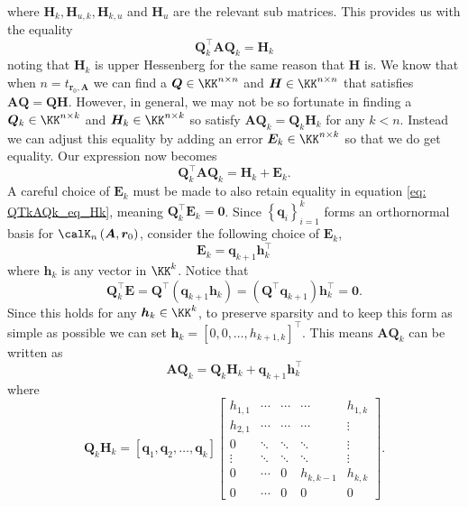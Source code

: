 where $\bm{H}_k , \bm{H}_{u,k}, \bm{H}_{k,u}$ and $\bm{H}_u$ are the relevant sub matrices. This provides us with the equality
\begin{equation}\label{eq: QTkAQk_eq_Hk}
    \bm{Q}_{k}^{\intercal} \bm{A} \bm{Q}_{k} = \bm{H}_k
\end{equation}
noting that $\bm{H}_{k}$ is upper Hessenberg for the same reason that $\bm{H}$ is. We know that when $n = t_{\bm{r}_0, \bm{A}}$ we can find a $\bm{Q} \in \KK^{n \times n}$ and $\bm{H} \in \KK^{n \times n}$ that satisfies $\bm{A} \bm{Q} = \bm{Q} \bm{H}$. However, in general, we may not be so fortunate in finding a $\bm{Q}_{k} \in \KK^{n \times k}$ and $\bm{H}_{k} \in \KK^{n \times k}$ so satisfy $\bm{A} \bm{Q}_{k} = \bm{Q}_{k} \bm{H}_k$ for any $k < n$. Instead we can adjust this equality by adding an error $\bm{E}_k \in \KK^{n \times k}$ so that we do get equality. Our expression now becomes
\begin{equation}\label{eq: QTkAQk_eq_HkEk}
    \bm{Q}_{k}^{\intercal} \bm{A} \bm{Q}_{k} = \bm{H}_k + \bm{E}_k.
\end{equation}
A careful choice of $\bm{E}_k$ must be made to also retain equality in equation \ref{eq: QTkAQk_eq_Hk}, meaning $\bm{Q}_{k}^{\intercal} \bm{E}_k = \bm{0}$. Since $\left\{ \bm{q}_i \right\}_{i=1}^{k}$ forms an orthornormal basis for $\calK_{n} \left( \bm{A}, \bm{r}_0 \right)$, consider the following choice of $\bm{E}_k$,
\[
    \bm{E}_k = \bm{q}_{k+1} \bm{h}_{k}^{\intercal}
\]
where $\bm{h}_k$ is any vector in $\KK^{k}$. Notice that
\[
    \bm{Q}_{k}^{\intercal} \bm{E} = \bm{Q}^{\intercal} \left( \bm{q}_{k+1} \bm{h}_k \right) = \left( \bm{Q}^{\intercal} \bm{q}_{k+1} \right) \bm{h}_{k}^{\intercal} = \bm{0}.
\]
Since this holds for any $\bm{h}_k \in \KK^{k}$, to preserve sparsity and to keep this form as simple as possible we can set $\bm{h}_k = \left[ 0,0, \ldots , h_{k+1,k} \right]^{\intercal}$. This means $\bm{A} \bm{Q}_k$ can be written as
\begin{equation}\label{eq: QTkAQk_eq_Hk_p_qkhk}
    \bm{A} \bm{Q}_k =  \bm{Q}_k \bm{H}_k + \bm{q}_{k+1} \bm{h}_{k}^{\intercal}
\end{equation}
where
\[
    \bm{Q}_k \bm{H}_k =
    \left[ \bm{q}_1 , \bm{q}_2 , \ldots , \bm{q}_k \right]
    \begin{bmatrix}
        h_{1,1} & \cdots & \cdots & \cdots    & h_{1,k} \\
        h_{2,1} & \cdots & \cdots & \cdots    & \vdots  \\
        0       & \ddots & \ddots & \ddots    & \vdots  \\
        \vdots  & \ddots & \ddots & \ddots    & \vdots  \\
        0       & \cdots & 0      & h_{k,k-1} & h_{k,k} \\
        0       & \cdots & 0      & 0         & 0
    \end{bmatrix}.
\]
